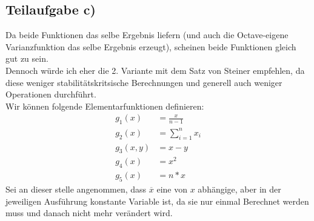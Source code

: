 \documentclass{llncs}
\begin{document}
\subsection*{Teilaufgabe c)}
Da beide Funktionen das selbe Ergebnis liefern (und auch die Octave-eigene Varianzfunktion das selbe Ergebnis erzeugt), scheinen beide Funktionen gleich gut zu sein.\\
Dennoch würde ich eher die 2. Variante mit dem Satz von Steiner empfehlen, da diese weniger stabilitätskritsische Berechnungen und generell auch weniger Operationen durchführt.\\
Wir können folgende Elementarfunktionen definieren:
\begin{align*}
g_1(x)&= \frac{x}{n-1}\\
g_2(x)&=\sum_{i=1}^n x_i\\
g_3(x,y)&= x-y\\
g_4(x)&=x^2\\
g_5(x) &= n*x
\end{align*}
Sei an dieser stelle angenommen, dass $\overline{x}$ eine von $x$ abhängige, aber in der jeweiligen Ausführung konstante Variable ist, da sie nur einmal Berechnet werden muss und danach nicht mehr verändert wird.
\end{document}
